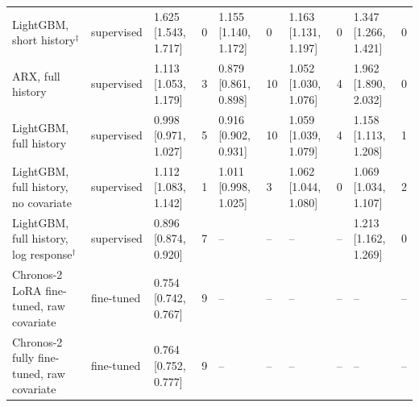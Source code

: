 \begin{table}[t]
{\begin{tabular}{llllllllll}
LightGBM, short history$^{\ddagger}$ & supervised & 1.625 [1.543, 1.717] & 0 & 1.155 [1.140, 1.172] & 0 & 1.163 [1.131, 1.197] & 0 & 1.347 [1.266, 1.421] & 0 \\
ARX, full history & supervised & 1.113 [1.053, 1.179] & 3 & 0.879 [0.861, 0.898] & 10 & 1.052 [1.030, 1.076] & 4 & 1.962 [1.890, 2.032] & 0 \\
LightGBM, full history & supervised & 0.998 [0.971, 1.027] & 5 & 0.916 [0.902, 0.931] & 10 & 1.059 [1.039, 1.079] & 4 & 1.158 [1.113, 1.208] & 1 \\
LightGBM, full history, no covariate & supervised & 1.112 [1.083, 1.142] & 1 & 1.011 [0.998, 1.025] & 3 & 1.062 [1.044, 1.080] & 0 & 1.069 [1.034, 1.107] & 2 \\
LightGBM, full history, log response$^{\dagger}$ & supervised & 0.896 [0.874, 0.920] & 7 & -- & -- & -- & -- & 1.213 [1.162, 1.269] & 0 \\
\addlinespace
Chronos-2 LoRA fine-tuned, raw covariate & fine-tuned & 0.754 [0.742, 0.767] & 9 & -- & -- & -- & -- & -- & -- \\
Chronos-2 fully fine-tuned, raw covariate & fine-tuned & 0.764 [0.752, 0.777] & 9 & -- & -- & -- & -- & -- & -- \\
\bottomrule
\end{tabular}}
\end{table}
